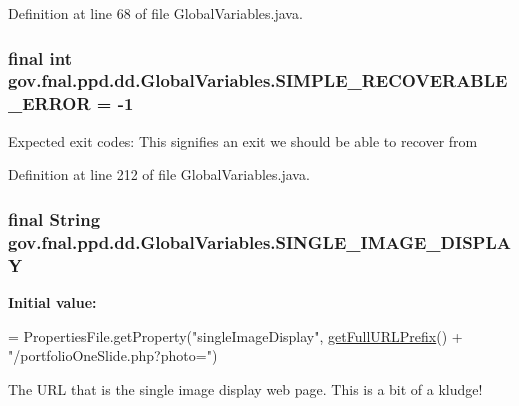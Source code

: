 Definition at line 68 of file Global\-Variables.\-java.

\hypertarget{classgov_1_1fnal_1_1ppd_1_1dd_1_1GlobalVariables_aa1eece63cce68ac0186379fc2fa2272a}{
\subsubsection[{S\-I\-M\-P\-L\-E\-\_\-\-R\-E\-C\-O\-V\-E\-R\-A\-B\-L\-E\-\_\-\-E\-R\-R\-O\-R}]{\setlength{\rightskip}{0pt plus 5cm}final int gov.\-fnal.\-ppd.\-dd.\-Global\-Variables.\-S\-I\-M\-P\-L\-E\-\_\-\-R\-E\-C\-O\-V\-E\-R\-A\-B\-L\-E\-\_\-\-E\-R\-R\-O\-R = -\/1\hspace{0.3cm}{\ttfamily [static]}}}\label{classgov_1_1fnal_1_1ppd_1_1dd_1_1GlobalVariables_aa1eece63cce68ac0186379fc2fa2272a}
Expected exit codes\-: This signifies an exit we should be able to recover from 

Definition at line 212 of file Global\-Variables.\-java.

\hypertarget{classgov_1_1fnal_1_1ppd_1_1dd_1_1GlobalVariables_ab018dd06fadda0d1bc99e7de66894e84}{
\subsubsection[{S\-I\-N\-G\-L\-E\-\_\-\-I\-M\-A\-G\-E\-\_\-\-D\-I\-S\-P\-L\-A\-Y}]{\setlength{\rightskip}{0pt plus 5cm}final String gov.\-fnal.\-ppd.\-dd.\-Global\-Variables.\-S\-I\-N\-G\-L\-E\-\_\-\-I\-M\-A\-G\-E\-\_\-\-D\-I\-S\-P\-L\-A\-Y\hspace{0.3cm}{\ttfamily [static]}}}\label{classgov_1_1fnal_1_1ppd_1_1dd_1_1GlobalVariables_ab018dd06fadda0d1bc99e7de66894e84}
{\bfseries Initial value\-:}
\begin{DoxyCode}
= PropertiesFile.getProperty(\textcolor{stringliteral}{"singleImageDisplay"},
            \hyperlink{classgov_1_1fnal_1_1ppd_1_1dd_1_1GlobalVariables_ab7639ebfcc296b374593079a06026c65}{getFullURLPrefix}() + \textcolor{stringliteral}{"/portfolioOneSlide.php?photo="})
\end{DoxyCode}
The U\-R\-L that is the single image display web page. This is a bit of a kludge! 

